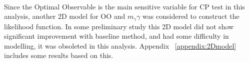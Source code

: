\paragraph{} Since the Optimal Observable is the main sensitive variable for CP test in this analysis, another 2D model for OO and $m_\gamma\gamma$ was considered to construct the likelihood function. In some preliminary study this 2D model did not show significant improvement with baseline method, and had some difficulty in modelling, it was obsoleted in this analysis. Appendix ~\ref{appendix:2Dmodel} includes some results based on this. 

